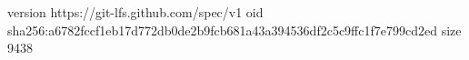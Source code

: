 version https://git-lfs.github.com/spec/v1
oid sha256:a6782fccf1eb17d772db0de2b9fcb681a43a394536df2c5c9ffc1f7e799cd2ed
size 9438
